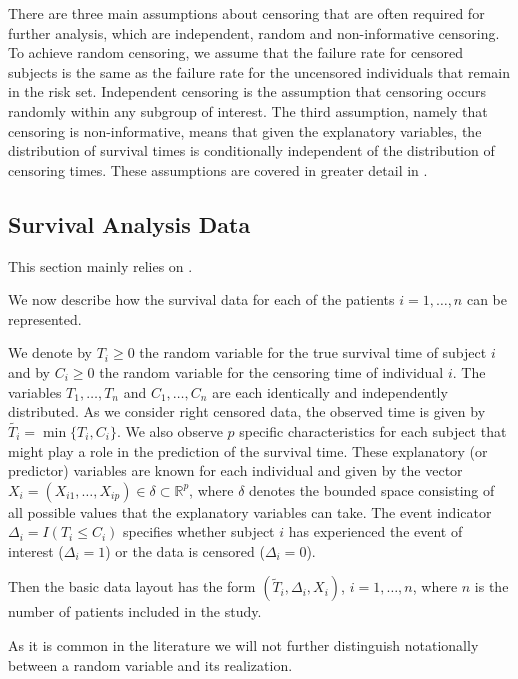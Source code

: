 \documentclass[12pt, a4paper]{scrartcl}
\theoremstyle{definition}
\theoremstyle{plain}
\numberwithin{equation}{section}
\numberwithin{figure}{section}
\numberwithin{table}{section}
\begin{document}
	There are three main assumptions about censoring that are often required for further analysis, which are independent, random and non-informative censoring.
	To achieve random censoring, we assume that the failure rate for censored subjects is the same as the failure rate for the uncensored individuals that remain in the risk set.
	Independent censoring is the assumption that censoring occurs randomly within any subgroup of interest.
	The third assumption, namely that censoring is non-informative, means that given the explanatory variables, the distribution of survival times is conditionally independent of the distribution of censoring times.
	These assumptions are covered in greater detail in \citet*{bookfailuretime}.
	
	
	\subsection{Survival Analysis Data} \label{sabasics}
	
	This section mainly relies on \citet*{sabook}.
	
	We now describe how the survival data for each of the patients $i = 1, \dots, n$ can be represented.
	
	We denote by $T_i \geq 0$ the random variable for the true survival time of subject $i$ and by $C_i \geq 0$ the random variable for the censoring time of individual $i$.
	The variables $T_1,\dots,T_n$ and $C_1,\dots,C_n$ are each identically and independently distributed.
	As we consider right censored data, the observed time is given by $\tilde{T_i} = \min\{T_i,C_i\}$.
	We also observe $p$ specific characteristics for each subject that might play a role in the prediction of the survival time.
	These explanatory (or predictor) variables are known for each individual and given by the vector $X_i = (X_{i1}, \dots , X_{ip}) \in \delta \subset \mathbb{R}^p$, where $\delta$ denotes the bounded space consisting of all possible values that the explanatory variables can take.
	The event indicator $\Delta_i = I(T_i \leq C_i)$ specifies whether subject $i$ has experienced the event of interest ($\Delta_i=1$) or the data is censored ($\Delta_i=0$).
	
	Then the basic data layout has the form $(\tilde{T}_i, \Delta_i, X_i)$, $i = 1, \dots , n$, where $n$ is the number of patients included in the study.
	
	As it is common in the literature we will not further distinguish notationally between a random variable and its realization.
	
\end{document}
